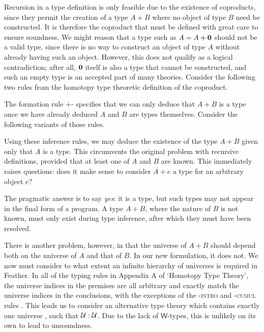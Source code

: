 \documentclass[11pt]{book}
\begin{document}
Recursion in a type definition is only feasible due to the existence of coproducts, since they permit the creation of a type \( A + B \) where no object of type \( B \) need be constructed.
It is therefore the coproduct that must be defined with great care to ensure soundness.
We might reason that a type such as \( A = A + \mathbf{0} \) should not be a valid type, since there is no way to construct an object of type \( A \) without already having such an object.
However, this does not qualify as a logical contradiction; after all, \( \mathbf{0} \) itself is also a type that cannot be constructed, and such an empty type is an accepted part of many theories.
Consider the following two rules from the homotopy type theoretic definition of the coproduct.
The formation rule \( + \)-\rform{} specifies that we can only deduce that \( A+B \) is a type once we have already deduced \( A \) and \( B \) are types themselves.
Consider the following variants of those rules.
Using these inference rules, we may deduce the existence of the type \( A+B \) given only that \( A \) is a type.
This circumvents the original problem with recursive definitions, provided that at least one of \( A \) and \( B \) are known.
This immediately raises questions: does it make sense to consider \( A + e \) a type for an arbitrary object \( e \)?

The pragmatic answer is to say \textit{yes}: it is a type, but such types may not appear in the final form of a program.
A type \( A + B \), where the nature of \( B \) is not known, must only exist during type inference, after which they must have been resolved.

There is another problem, however, in that the universe of \( A + B \) should depend both on the universe of \( A \) and that of \( B \).
In our new formulation, it does not.
We now must consider to what extent an infinite hierarchy of universes is required in Feather.
In all of the typing rules in Appendix A of `Homotopy Type Theory', the universe indices in the premises are all arbitrary and exactly match the universe indices in the conclusions, with the exceptions of the \UU-\textsc{intro} and \UU-\textsc{cumul} rules \cite{hottbook}.
This leads us to consider an alternative type theory which contains exactly one universe \UU{}, such that \( \mathcal{U} : \mathcal{U} \).
Due to the lack of \( \mathsf{W} \)-types, this is unlikely on its own to lead to unsoundness.
\end{document}
